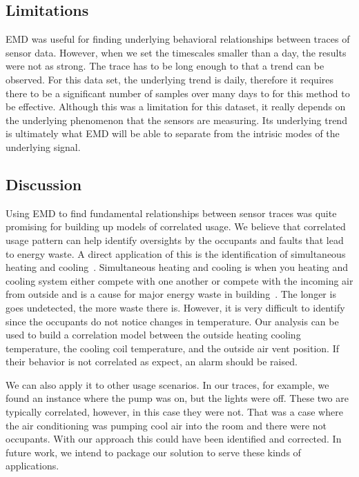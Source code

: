 \subsection{Limitations}
EMD was useful for finding underlying behavioral relationships between traces of sensor data.  However,
when we set the timescales smaller than a day, the results were not as strong.
The trace has to be long enough to that a trend can be observed.  For this data set, the underlying
trend is daily, therefore it requires there to be a significant number of samples over many days to
for this method to be effective.
Although this was a limitation for this dataset, it really depends on the underlying phenomenon that
the sensors are measuring.  Its underlying trend is ultimately what EMD will be able to separate
from the intrisic modes of the underlying signal.

\subsection{Discussion}
Using EMD to find fundamental relationships between sensor traces was quite promising for building
up models of correlated usage.  We believe that correlated usage pattern can help identify oversights
by the occupants and faults that lead to energy waste.  A direct application of this is the identification
of simultaneous heating and cooling~\cite{simheatcool}.  Simultaneous heating and cooling is when you heating
and cooling system either compete with one another or compete with the incoming air from outside and is
a cause for major energy waste in building~\cite{simheatcool}.  The longer is goes undetected,
the more waste there is.  However, it is very difficult to identify since the occupants do not notice
changes in temperature.  Our analysis can be used to build a correlation model between the outside
heating cooling temperature, the cooling coil temperature, and the outside air vent position.  If their behavior
is not correlated as expect, an alarm should be raised.

We can also apply it to other usage scenarios.  In our traces, for example, we found an instance where the pump
was on, but the lights were off.  These two are typically correlated, however, in this case they were not.
That was a case where the air conditioning was pumping cool air into the room and there were not occupants.
With our approach this could have been identified and corrected.  In future work, we intend to
package our solution to serve these kinds of applications.

